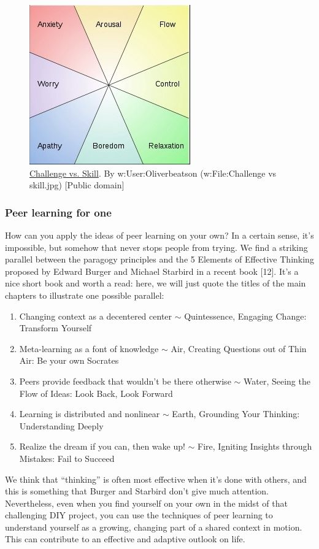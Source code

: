 \begin{figure}
\begin{center}
\includegraphics[width=.45\textwidth]{../pictures/challenge.jpg}
\end{center}
\caption*{\href{http://commons.wikimedia.org/wiki/File\%3AChallenge\_vs\_skill.svg}{Challenge
 vs. Skill}. By w:User:Oliverbeatson (w:File:Challenge vs skill.jpg)
{[}Public domain{]}}
\end{figure}

\subsubsection{Peer learning for one}

How can you apply the ideas of peer learning on your own? In a certain
sense, it's impossible, but somehow that never stops people from trying.
We find a striking parallel between the paragogy principles and the 5
Elements of Effective Thinking proposed by Edward Burger and Michael
Starbird in a recent book {[}12{]}. It's a nice short book and worth a
read: here, we will just quote the titles of the main chapters to
illustrate one possible parallel:

\begin{enumerate}
\item
  Changing context as a decentered center \ensuremath{\sim}
  Quintessence, Engaging Change: Transform Yourself
\item
  Meta-learning as a font of knowledge \ensuremath{\sim} Air, Creating
  Questions out of Thin Air: Be your own Socrates
\item
  Peers provide feedback that wouldn't be there otherwise
  \ensuremath{\sim} Water, Seeing the Flow of Ideas: Look Back, Look
  Forward
\item
  Learning is distributed and nonlinear \ensuremath{\sim} Earth,
  Grounding Your Thinking: Understanding Deeply
\item
  Realize the dream if you can, then wake up! \ensuremath{\sim} Fire,
  Igniting Insights through Mistakes: Fail to Succeed
\end{enumerate}
We think that ``thinking'' is often most effective when it's done with
others, and this is something that Burger and Starbird don't give much
attention. Nevertheless, even when you find yourself on your own in the
midst of that challenging DIY project, you can use the techniques of
peer learning to understand yourself as a growing, changing part of a
shared context in motion. This can contribute to an effective and
adaptive outlook on life.

